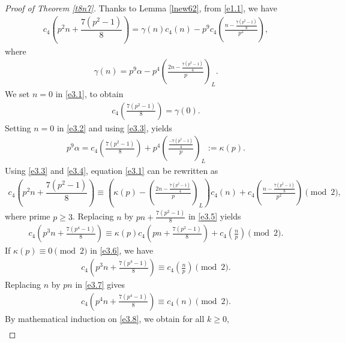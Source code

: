 \documentclass[11pt,a4paper]{article}
\numberwithin{equation}{section}
\theoremstyle{plain}
\begin{document}
		\begin{proof}[Proof of Theorem \ref{t8n7}\unskip]
		Thanks to Lemma \ref{lnew62}, from \eqref{e1.1}, we have
		\begin{align}\label{e3.1}
			c_4\displaystyle\left(p^2n+\dfrac{7(p^2-1)}{8}\right)=\gamma(n)c_4(n)-p^9c_4\displaystyle\left(\frac{n-\frac{7(p^2-1)}{8}}{p^2}\right),
		\end{align}
		where
		\begin{align}\label{e3.2}
			\gamma(n)=p^9\alpha-p^4\displaystyle\left(\frac{2n-\frac{7(p^2-1)}{4}}{p}\right)_L.
		\end{align}
		We set $n=0$ in \eqref{e3.1}, to obtain
		\begin{align}\label{e3.3}
			c_4\displaystyle\left(\frac{7(p^2-1)}{8}\right)=\gamma(0).
		\end{align}
		Setting $n=0$ in \eqref{e3.2} and using \eqref{e3.3}, yields
		\begin{align}\label{e3.4}
			p^9\alpha=c_4\displaystyle\left(\frac{7(p^2-1)}{8}\right)+p^4\displaystyle\left(\frac{\frac{-7(p^2-1)}{4}}{p}\right)_L:=\kappa(p).
		\end{align}
		Using \eqref{e3.3} and \eqref{e3.4}, equation \eqref{e3.1} can be rewritten as
		\begin{align}\label{e3.5}
			c_4\displaystyle\left(p^2n+\dfrac{7(p^2-1)}{8}\right)\equiv\displaystyle\left(\kappa(p)-\displaystyle\left(\frac{2n-\frac{7(p^2-1)}{4}}{p}\right)_L\right)c_4(n)+c_4\displaystyle\left(\frac{n-\frac{7(p^2-1)}{8}}{p^2}\right)\pmod 2,
		\end{align}
		where prime $p\ge3$.
		Replacing $n$ by $pn+\frac{7(p^2-1)}{8}$ in \eqref{e3.5} yields
		\begin{align}\label{e3.6}
			c_4\displaystyle\left(p^3n+\frac{7(p^4-1)}{8}\right)\equiv\kappa(p)c_4\displaystyle\left(pn+\frac{7(p^2-1)}{8}\right)+c_4\displaystyle\left(\frac{n}{p}\right)\pmod 2.
		\end{align}
		If $\kappa(p)\equiv0\pmod2$ in \eqref{e3.6}, we have
		\begin{align}\label{e3.7}
			c_4\displaystyle\left(p^3n+\frac{7(p^4-1)}{8}\right)\equiv c_4\displaystyle\left(\frac{n}{p}\right)\pmod2.
		\end{align}
		Replacing $n$ by $pn$ in \eqref{e3.7} gives 
		\begin{align}\label{e3.8}
			c_4\displaystyle\left(p^4n+\frac{7(p^4-1)}{8}\right)\equiv c_4(n)\pmod2.	
		\end{align}
		By mathematical induction on \eqref{e3.8}, we obtain for all $k\ge0$,
		\begin{align}\label{e3.9}

\end{align}
\end{proof}
\end{document}
